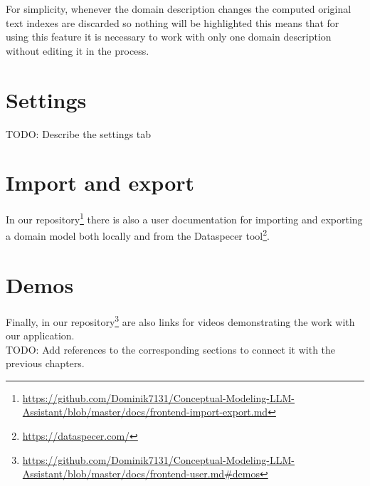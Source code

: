 For simplicity, whenever the domain description changes the computed original text indexes are discarded so nothing will be highlighted this means that for using this feature it is necessary to work with only one domain description without editing it in the process.


\section{Settings}

\noindent{}TODO: Describe the settings tab

\section{Import and export}

In our repository\footnote{\url{https://github.com/Dominik7131/Conceptual-Modeling-LLM-Assistant/blob/master/docs/frontend-import-export.md}} there is also a user documentation for importing and exporting a domain model both locally and from the Dataspecer tool\footnote{\url{https://dataspecer.com/}}.

\section{Demos}

Finally, in our repository\footnote{\url{https://github.com/Dominik7131/Conceptual-Modeling-LLM-Assistant/blob/master/docs/frontend-user.md\#demos}} are also links for videos demonstrating the work with our application. \\

\noindent{}TODO: Add references to the corresponding sections to connect it with the previous chapters.
